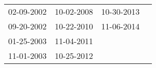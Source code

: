 \begin{supertabular}{llll}
 02-09-2002 &  10-02-2008 &  10-30-2013 \\
 09-20-2002 &  10-22-2010 &  11-06-2014 \\
 01-25-2003 &  11-04-2011 &             \\
 11-01-2003 &  10-25-2012 &             \\
\end{supertabular}
